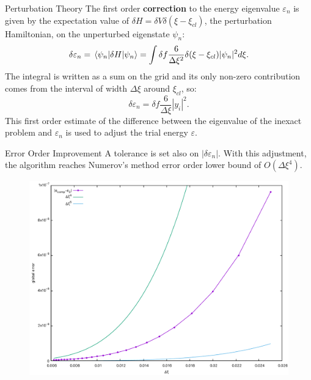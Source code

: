 \documentclass{beamer}
\begin{document}
\begin{frame}{Perturbation Theory}
The first order \textbf{correction} to the energy eigenvalue $\varepsilon_n$ is given by the expectation value of $\delta H=\delta V\delta(\xi-\xi_{cl})$, the perturbation Hamiltonian, on the unperturbed eigenstate $\psi_n$:
$$\delta \varepsilon_n = \expval{\delta H}{\psi_n}=\int\delta f\frac{6}{\Delta \xi^2} \delta (\xi-\xi_{cl})|\psi_n|^2d\xi.$$
The integral is written as a sum on the grid and its only non-zero contribution comes from the interval of width $\Delta \xi$ around $\xi_{cl}$, so:
$$\delta\varepsilon_n=\delta f\frac{6}{\Delta \xi}|y_i|^2.$$
This first order estimate of the difference between the eigenvalue of the inexact problem and $\varepsilon_n$ is used to adjust the trial energy $\varepsilon$.
\end{frame}

\begin{frame}{Error Order Improvement}
A tolerance is set also on $|\delta \varepsilon_n|$. With this adjustment, the algorithm reaches Numerov's method error order lower bound of $O(\Delta \xi^4)$.
\begin{figure}
\centering
\includegraphics[width=0.75\linewidth]{../gnuplot/image5.pdf}
\end{figure}
\end{frame}
\end{document}
